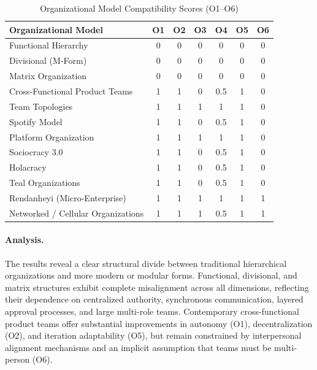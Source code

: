 \documentclass[11pt, a4paper, twocolumn]{article} %
\begin{document}
\begin{table}[h]
\centering
\caption{Organizational Model Compatibility Scores (O1--O6)}
\label{tab:org-scores}
\begin{tabular}{lcccccc}
\toprule
\textbf{Organizational Model} & O1 & O2 & O3 & O4 & O5 & O6 \\
\midrule
Functional Hierarchy               & 0   & 0   & 0   & 0   & 0   & 0   \\
Divisional (M-Form)                & 0   & 0   & 0   & 0   & 0   & 0   \\
Matrix Organization                & 0   & 0   & 0   & 0   & 0   & 0   \\
Cross-Functional Product Teams     & 1   & 1   & 0   & 0.5 & 1   & 0   \\
Team Topologies                    & 1   & 1   & 1   & 1   & 1   & 0   \\
Spotify Model                      & 1   & 1   & 0   & 0.5 & 1   & 0   \\
Platform Organization              & 1   & 1   & 1   & 1   & 1   & 0   \\
Sociocracy 3.0                     & 1   & 1   & 0   & 0.5 & 1   & 0   \\
Holacracy                          & 1   & 1   & 0   & 0.5 & 1   & 0   \\
Teal Organizations                 & 1   & 1   & 0   & 0.5 & 1   & 0   \\
Rendanheyi (Micro-Enterprise)      & 1   & 1   & 1   & 1   & 1   & 1   \\
Networked / Cellular Organizations & 1   & 1   & 1   & 0.5 & 1   & 1   \\
\bottomrule
\end{tabular}
\end{table}

\paragraph{Analysis.}

The results reveal a clear structural divide between traditional hierarchical
organizations and more modern or modular forms. Functional, divisional, and
matrix structures exhibit complete misalignment across all dimensions, reflecting
their dependence on centralized authority, synchronous communication, layered
approval processes, and large multi-role teams. Contemporary cross-functional
product teams offer substantial improvements in autonomy (O1), decentralization
(O2), and iteration adaptability (O5), but remain constrained by interpersonal
alignment mechanisms and an implicit assumption that teams must be multi-person
(O6).
\end{document}
